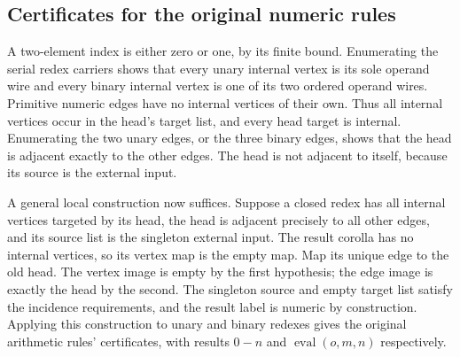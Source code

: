 
\subsection{Certificates for the original numeric rules}

A two-element index is either zero or one, by its finite bound. Enumerating
the serial redex carriers shows that every unary internal vertex is its sole
operand wire and every binary internal vertex is one of its two ordered operand
wires. Primitive numeric edges have no internal vertices of their own. Thus
all internal vertices occur in the head's target list, and every head target
is internal. Enumerating the two unary edges, or the three binary edges, shows
that the head is adjacent exactly to the other edges. The head is not adjacent
to itself, because its source is the external input.








A general local construction now suffices. Suppose a closed redex has all
internal vertices targeted by its head, the head is adjacent precisely to all
other edges, and its source list is the singleton external input. The result
corolla has no internal vertices, so its vertex map is the empty map. Map its
unique edge to the old head. The vertex image is empty by the first hypothesis;
the edge image is exactly the head by the second. The singleton source and empty
target list satisfy the incidence requirements, and the result label is numeric
by construction. Applying this construction to unary and binary redexes gives
the original arithmetic rules' certificates, with results $0-n$ and
$\operatorname{eval}(o,m,n)$ respectively.

